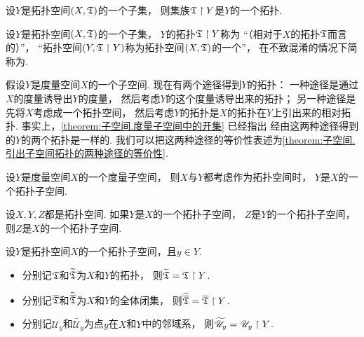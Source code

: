 \begin{lemma}
设\(Y\)是拓扑空间\((X,{\mathfrak T})\)的一个子集，
则集族\({\mathfrak T} \upharpoonright Y\)是\(Y\)的一个拓扑.
\end{lemma}

\begin{definition}
设\(Y\)是拓扑空间\((X,{\mathfrak T})\)的一个子集，
\(Y\)的拓扑\({\mathfrak T} \upharpoonright Y\)称为
“（相对于\(X\)的拓扑\({\mathfrak T}\)而言的）”，
“拓扑空间\((Y,{\mathfrak T} \upharpoonright Y)\)称为拓扑空间\((X,{\mathfrak T})\)的一个”，
在不致混淆的情况下简称为.
\end{definition}

假设\(Y\)是度量空间\(X\)的一个子空间.
现在有两个途径得到\(Y\)的拓扑：
一种途径是通过\(X\)的度量诱导出\(Y\)的度量，
然后考虑\(Y\)的这个度量诱导出来的拓扑；
另一种途径是先将\(X\)考虑成一个拓扑空间，
然后考虑\(Y\)的拓扑是\(X\)的拓扑在\(Y\)上引出来的相对拓扑.
事实上，\cref{theorem:子空间.度量子空间中的开集} 已经指出
经由这两种途径得到的\(Y\)的两个拓扑是一样的.
我们可以把这两种途径的等价性表述为\cref{theorem:子空间.引出子空间拓扑的两种途径的等价性}.
\begin{theorem}\label{theorem:子空间.引出子空间拓扑的两种途径的等价性}
设\(Y\)是度量空间\(X\)的一个度量子空间，
则\(X\)与\(Y\)都考虑作为拓扑空间时，
\(Y\)是\(X\)的一个拓扑子空间.
\end{theorem}

\begin{theorem}\label{theorem:子空间.亲子空间的传递性}
设\(X,Y,Z\)都是拓扑空间.
如果\(Y\)是\(X\)的一个拓扑子空间，
\(Z\)是\(Y\)的一个拓扑子空间，
则\(Z\)是\(X\)的一个拓扑子空间.
\end{theorem}

\begin{theorem}
设\(Y\)是拓扑空间\(X\)的一个拓扑子空间，且\(y \in Y\).
\def\Uy{\mathscr{U}_y}
\def\wUy{\widetilde{\Uy}}
\begin{itemize}
	\item 分别记\({\mathfrak T}\)和\(\widetilde{{\mathfrak T}}\)为\(X\)和\(Y\)的拓扑，
	则\(\widetilde{{\mathfrak T}} = {\mathfrak T} \upharpoonright Y\).
	\item 分别记\(\overline{{\mathfrak T}}\)和\(\widetilde{\overline{{\mathfrak T}}}\)为\(X\)和\(Y\)的全体闭集，
	则\(\widetilde{\overline{{\mathfrak T}}} = \overline{{\mathfrak T}} \upharpoonright Y\).
	\item 分别记\(\Uy\)和\(\wUy\)为点\(y\)在\(X\)和\(Y\)中的邻域系，
	则\(\wUy = \Uy \SetRestrict Y\).
\end{itemize}
\end{theorem}

